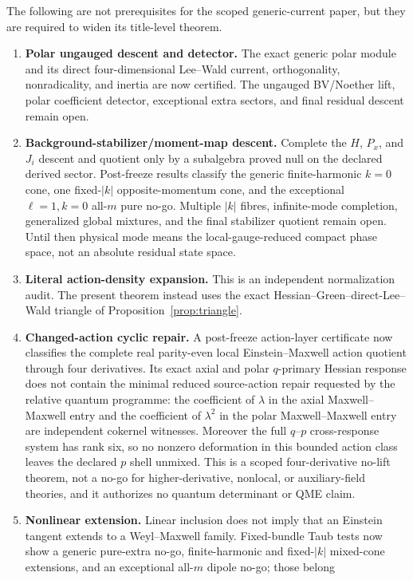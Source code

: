 \documentclass[11pt]{article}
\theoremstyle{remark}
\begin{document}
The following are not prerequisites for the scoped generic-current paper, but they are
required to widen its title-level theorem.
\begin{enumerate}
\item \textbf{Polar ungauged descent and detector.} The exact generic polar
module and its direct four-dimensional Lee--Wald current, orthogonality,
nonradicality, and inertia are now certified. The ungauged BV/Noether lift,
polar coefficient detector, exceptional extra sectors, and final residual
descent remain open.
\item \textbf{Background-stabilizer/moment-map descent.} Complete the
$H$, $P_x$, and $J_i$ descent and quotient only by a subalgebra proved null
on the declared derived sector.  Post-freeze results classify the generic
finite-harmonic $k=0$ cone, one fixed-$|k|$ opposite-momentum cone, and the
exceptional $\ell=1,k=0$ all-$m$ pure no-go.  Multiple $|k|$ fibres,
infinite-mode completion, generalized global mixtures, and the final
stabilizer quotient remain open. Until then physical mode means the
local-gauge-reduced compact phase space, not an absolute residual state space.
\item \textbf{Literal action-density expansion.} This is an independent
normalization audit. The present theorem instead uses the exact
Hessian--Green--direct-Lee--Wald triangle of Proposition~\ref{prop:triangle}.
\item \textbf{Changed-action cyclic repair.} A post-freeze action-layer
certificate now classifies the complete real parity-even local
Einstein--Maxwell action quotient through four derivatives.  Its exact axial
and polar $q$-primary Hessian response does not contain the minimal reduced
source-action repair requested by the relative quantum programme: the
coefficient of $\lambda$ in the axial Maxwell--Maxwell entry and the
coefficient of $\lambda^2$ in the polar Maxwell--Maxwell entry are independent
cokernel witnesses.  Moreover the full $q$--$p$ cross-response system has
rank six, so no nonzero deformation in this bounded action class leaves the
declared $p$ shell unmixed.  This is a scoped four-derivative no-lift theorem,
not a no-go for higher-derivative, nonlocal, or auxiliary-field theories, and
it authorizes no quantum determinant or QME claim.
\item \textbf{Nonlinear extension.} Linear inclusion does not imply that an
Einstein tangent extends to a Weyl--Maxwell family. Fixed-bundle Taub tests
now show a generic pure-extra no-go, finite-harmonic and fixed-$|k|$
mixed-cone extensions, and an exceptional all-$m$ dipole no-go; those belong

\end{enumerate}
\end{document}
